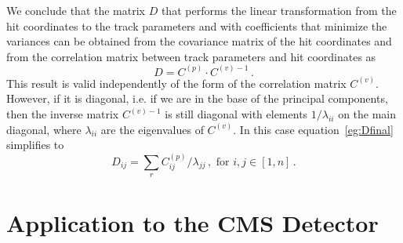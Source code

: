 \documentclass[10pt,a4paper]{report}
\begin{document}
We conclude that the matrix $D$ that performs the linear transformation from the hit coordinates to the track parameters and with coefficients that minimize the variances can be obtained from the covariance matrix of the hit coordinates and from the correlation matrix between track parameters and hit coordinates as
\begin{equation}
D = C^{(p)} \cdot C^{(v)-1} \, .
\label{eg:Dfinal}
\end{equation}
This result is valid independently of the form of the correlation matrix $C^{(v)}$. However, if it is diagonal, i.e. if we are in the base of the principal components, then the inverse matrix $C^{(v)-1}$ is still diagonal with elements $1/\lambda_{ii}$ on the main diagonal, where $\lambda_{ii}$ are the eigenvalues of $C^{(v)}$. In this case equation~\ref{eg:Dfinal} simplifies to
\begin{equation}
D_{ij} = \sum\limits_r C^{(p)}_{ij}/\lambda_{jj}\, , \, \, \mbox{for } i,j \in [1,n] \, .
\end{equation}


\section{Application to the CMS Detector}
\end{document}
